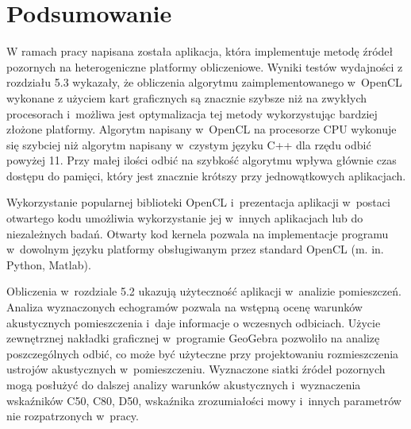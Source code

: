\chapter{Podsumowanie}\label{cha:podsum}

W ramach pracy napisana została aplikacja, która implementuje metodę źródeł pozornych na heterogeniczne platformy obliczeniowe. Wyniki testów wydajności z rozdziału 5.3 wykazały, że obliczenia algorytmu zaimplementowanego w~OpenCL wykonane z użyciem kart graficznych są znacznie szybsze niż na zwykłych procesorach i~możliwa jest optymalizacja tej metody wykorzystując bardziej złożone platformy. Algorytm napisany w~OpenCL na procesorze CPU wykonuje się szybciej niż algorytm napisany w~czystym języku C++ dla rzędu odbić powyżej 11. Przy małej ilości odbić na szybkość algorytmu wpływa głównie czas dostępu do pamięci, który jest znacznie krótszy przy jednowątkowych aplikacjach.    

Wykorzystanie popularnej biblioteki OpenCL i~prezentacja aplikacji w~postaci otwartego kodu umożliwia wykorzystanie jej w~innych aplikacjach  lub do niezależnych badań. Otwarty kod kernela pozwala na implementacje programu w~dowolnym języku platformy obsługiwanym przez standard OpenCL (m. in. Python, Matlab).

Obliczenia w~rozdziale 5.2 ukazują użyteczność aplikacji w~analizie pomieszczeń. Analiza wyznaczonych echogramów pozwala na wstępną ocenę warunków akustycznych pomieszczenia i~daje informacje o wczesnych odbiciach. Użycie zewnętrznej nakładki graficznej w~programie GeoGebra pozwoliło na analizę poszczególnych odbić, co może być użyteczne przy projektowaniu rozmieszczenia ustrojów akustycznych w~pomieszczeniu. Wyznaczone siatki źródeł pozornych mogą posłużyć do dalszej analizy warunków akustycznych i~wyznaczenia wskaźników C50, C80, D50, wskaźnika zrozumiałości mowy i~innych parametrów nie rozpatrzonych w~pracy.